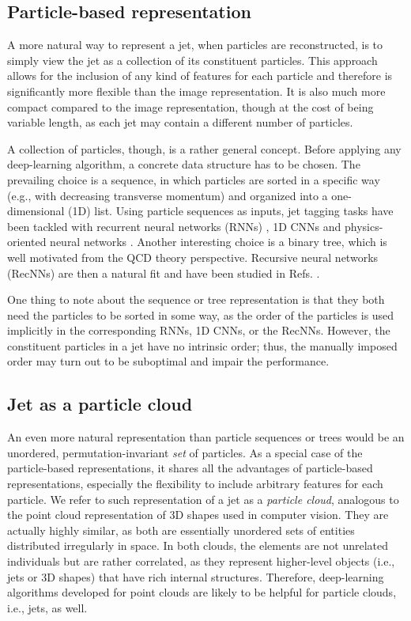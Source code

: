 \documentclass[aps,prd,longbibliography,reprint,amsmath,amssymb,amsfonts]{revtex4-1}
\begin{document}
\subsection{Particle-based representation}

A more natural way to represent a jet, when particles are reconstructed, is to simply view the jet as a collection of its constituent particles. This approach allows for the inclusion of any kind of features for each particle and therefore is significantly more flexible than the image representation. It is also much more compact compared to the image representation, though at the cost of being variable length, as each jet may contain a different number of particles. 

A collection of particles, though, is a rather general concept. Before applying any deep-learning algorithm, a concrete data structure has to be chosen. The prevailing choice is a sequence, in which particles are sorted in a specific way (e.g., with decreasing transverse momentum) and organized into a one-dimensional (1D) list. Using particle sequences as inputs, jet tagging tasks have been tackled with recurrent neural networks (RNNs) \cite{Guest:2016iqz,ATL-PHYS-PUB-2017-003,Pearkes:2017hku,Egan:2017ojy,Fraser:2018ieu}, 1D CNNs \cite{CMS-DP-2017-013,CMS-DP-2018-058,CMS-DP-2017-049,stoye2017deepjet,CMS-PAS-JME-18-002} and physics-oriented neural networks \cite{Butter:2017cot,Kasieczka:2018lwf,Erdmann:2018shi}. Another interesting choice is a binary tree, which is well motivated from the QCD theory perspective. Recursive neural networks (RecNNs) are then a natural fit and have been studied in Refs. \cite{Louppe:2017ipp,Cheng:2017rdo}. 

One thing to note about the sequence or tree representation is that they both need the particles to be sorted in some way, as the order of the particles is used implicitly in the corresponding RNNs, 1D CNNs, or the RecNNs. However, the constituent particles in a jet have no intrinsic order; thus, the manually imposed order may turn out to be suboptimal and impair the performance. 


\subsection{Jet as a particle cloud}

An even more natural representation than particle sequences or trees would be an unordered, permutation-invariant \textit{set} of particles. As a special case of the particle-based representations, it shares all the advantages of particle-based representations, especially the flexibility to include arbitrary features for each particle. We refer to such representation of a jet as a \textit{particle cloud}, analogous to the point cloud representation of 3D shapes used in computer vision. They are actually highly similar, as both are essentially unordered sets of entities distributed irregularly in space. In both clouds, the elements are not unrelated individuals but are rather correlated, as they represent higher-level objects (i.e., jets or 3D shapes) that have rich internal structures. Therefore, deep-learning algorithms developed for point clouds are likely to be helpful for particle clouds, i.e., jets, as well.
\end{document}
